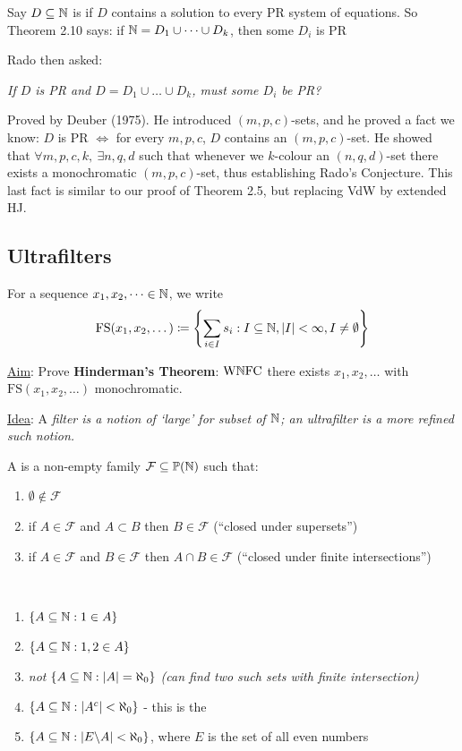 \documentclass[10pt]{article}
\newcommand{\wnfc}{\textrm{W}\N\textrm{FC}}
\newcommand{\fs}{\textrm{FS}}
\newcommand{\F}{\mathcal{F}}
\begin{document}
\begin{remark*}
    Say $D \subseteq \mathbb{N}$ is  if $D$ contains a solution to every PR system of equations. So Theorem 2.10 says: if $\mathbb{N} = D_1\cup\dots\cup D_k$, then some $D_i$ is PR

    Rado then asked:
    
    \emph{
        If $D$ is PR and $D = D_1\cup\dots\cup D_k$, must some $D_i$ be PR?
    }

    Proved by Deuber (1975). He introduced $(m,p,c)$-sets, and he proved a fact we know: $D$ is PR $\iff$ for every $m,p,c$, $D$ contains an $(m,p,c)$-set. He showed that $\forall m,p,c,k,\ \exists n,q,d$ such that whenever we $k$-colour an $(n,q,d)$-set there exists a monochromatic $(m,p,c)$-set, thus establishing Rado's Conjecture. This last fact is similar to our proof of Theorem 2.5, but replacing VdW by extended HJ.
\end{remark*}

\subsection*{Ultrafilters}

For a sequence $x_1,x_2,\dots \in \mathbb{N}$, we write $$\fs(x_1,x_2,\dots) \coloneqq \left\lbrace\sum_{i\in I}s_i : I\subset \N, |I| < \infty, I\ne \emptyset\right\rbrace$$

\underline{Aim}: Prove \textbf{Hinderman's Theorem}: $\wnfc$ there exists $x_1,x_2,\dots$ with $\fs(x_1,x_2,\dots)$ monochromatic.

\underline{Idea}: A \it{filter} is a notion of `large' for subset of $\mathbb{N}$; an \it{ultrafilter} is a more refined such notion.

\begin{defin*}[Filter]
    A  is a non-empty family $\F \subset \P(\N)$ such that:
    \begin{enumerate}[label = \roman*)]
        \item $\emptyset \not\in \F$
        \item if $A\in \F$ and $A\subset B$ then $B \in \F$ (``closed under supersets'')
        \item if $A \in \F$ and $B \in \F$ then $A\cap B \in \F$ (``closed under finite intersections'')
    \end{enumerate}
\end{defin*}
\begin{remark*}[Examples]\ 
    \begin{enumerate}[label = \arabic*)]
        \item $\{A\subseteq \mathbb{N} : 1 \in A\}$
        \item $\{A\subseteq \mathbb{N} : 1,2\in A\}$
        \item \it{not} $\{A\subseteq \mathbb{N} : |A| = \aleph_0\}$ (can find two such sets with finite intersection)
        \item $\{A\subseteq \mathbb{N}: |A^c| < \aleph_0\}$ - this is the \undf{cofinite filter}
        \item $\{A\subseteq \mathbb{N}: |E\backslash A| < \aleph_0\}$, where $E$ is the set of all even numbers
    \end{enumerate}
\end{remark*}
\end{document}
